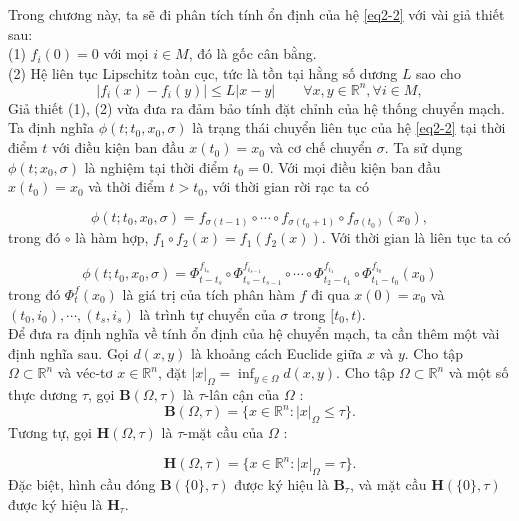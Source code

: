 \documentclass[14pt,a4paper,oneside]{report}		%
\theoremstyle{definition}
\begin{document}
Trong chương này, ta sẽ đi phân tích tính ổn định của hệ \ref{eq2-2} với vài giả thiết sau:\\
(1) $f_i(0)=0$ với mọi $i\in M$, đó là gốc cân bằng.\\
(2) Hệ liên tục Lipschitz toàn cục, tức là tồn tại hằng số dương $L$ sao cho
\begin{equation} \label{eq2-3}
|f_i(x)-f_i(y)|\leq L|x-y|\qquad \forall x,y \in \mathbb{R}^n,\forall i\in M,
\end{equation}
Giả thiết (1), (2) vừa đưa ra đảm bảo tính đặt chỉnh của hệ thống chuyển mạch.\\
Ta định nghĩa $\phi (t;t_0,x_0,\sigma)$ là trạng thái chuyển liên tục của hệ \ref{eq2-2} tại thời điểm $t$ với điều kiện ban đầu $x(t_0)=x_0$ và cơ chế chuyển $\sigma$. Ta sử dụng $\phi (t;x_0,\sigma)$ là nghiệm tại thời điểm $t_0 = 0$. Với mọi điều kiện ban đầu $x(t_0)=x_0$ và thời điểm $t>t_0$, với thời gian rời rạc ta có

\begin{equation} \label{eq2-4}
\phi (t;t_0,x_0,\sigma)=f_{\sigma (t-1)}\circ \cdots \circ f_{\sigma (t_0+1)}\circ f_{\sigma (t_0)}(x_0),
\end{equation}
trong đó $\circ$ là hàm hợp, $f_1 \circ f_2(x) = f_1(f_2(x))$. Với thời gian là liên tục ta có

\begin{equation} \label{eq2-5}
\phi (t;t_0,x_0,\sigma )=\Phi^{f_{i_s}}_{t-t_s}\circ\Phi^{f_{i_{s-1}}}_{t_s-t_{s-1}}\circ\cdots\circ\Phi^{f_{i_{1}}}_{t_2-t_{1}}\circ\Phi^{f_{i_{0}}}_{t_1-t_{0}}(x_0)
\end{equation}
trong đó $\Phi^f_t(x_0)$ là giá trị của tích phân hàm $f$ đi qua $x(0)=x_0$ và $(t_0,i_0),\cdots ,(t_s,i_s)$ là trình tự chuyển của $\sigma$ trong $[t_0,t)$.\\
Để đưa ra định nghĩa về tính ổn định của hệ chuyển mạch, ta cần thêm một vài định nghĩa sau. Gọi $d(x,y)$ là khoảng cách Euclide giữa $x$ và $y$. Cho tập $\Omega \subset\mathbb{R}^n$ và véc-tơ $x\in\mathbb{R}^n$, đặt $|x|_\Omega = \inf_{y\in\Omega}d(x,y)$. Cho tập $\Omega\subset\mathbb{R}^n$ và một số thực dương $\tau$, gọi $\mathbf{B}(\Omega , \tau)$ là $\tau$-lân cận của $\Omega$ :
$$\mathbf{B}(\Omega,\tau)=\{x\in\mathbb{R}^n:|x|_\Omega\leq\tau\}.$$
Tương tự, gọi $\mathbf{H}(\Omega,\tau)$ là $\tau$-mặt cầu của $\Omega$ :

$$\mathbf{H}(\Omega,\tau)=\{x\in\mathbb{R}^n:|x|_\Omega=\tau\}.$$
Đặc biệt, hình cầu đóng $\mathbf{B}(\{0\},\tau)$ được ký hiệu là $\mathbf{B}_\tau$, và mặt cầu $\mathbf{H}(\{0\},\tau)$ được ký hiệu là $\mathbf{H}_\tau$.
\end{document}
